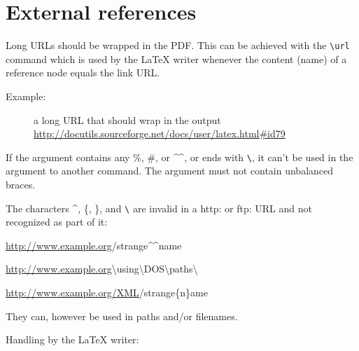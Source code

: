 \documentclass[a4paper]{article}
\newenvironment{DUlineblock}[1]{%
    \list{}{\setlength{\partopsep}{\parskip}
            \addtolength{\partopsep}{\baselineskip}
            \setlength{\topsep}{0pt}
            \setlength{\itemsep}{0.15\baselineskip}
            \setlength{\parsep}{0pt}
            \setlength{\leftmargin}{#1}}
    \raggedright
  }
  {\endlist}
\begin{document}
\section{External references%
  \label{external-references}%
}

Long URLs should be wrapped in the PDF. This can be achieved with the
\texttt{\textbackslash{}url} command which is used by the LaTeX writer whenever the content
(name) of a reference node equals the link URL.

\begin{description}
\item[{Example:}] 
a long URL that should wrap in the output
\url{http://docutils.sourceforge.net/docs/user/latex.html\#id79}

\end{description}

If the argument contains any \textquotedbl{}\%\textquotedbl{}, \textquotedbl{}\#\textquotedbl{}, or \textquotedbl{}\textasciicircum{}\textasciicircum{}\textquotedbl{}, or ends with \texttt{\textbackslash{}}, it can't
be used in the argument to another command. The argument must not contain
unbalanced braces.

The characters \textasciicircum{}, \{, \}, and \texttt{\textbackslash{}} are invalid in a \textquotedbl{}http:\textquotedbl{} or \textquotedbl{}ftp:\textquotedbl{} URL
and not recognized as part of it:

\begin{DUlineblock}{0em}
\item[] \url{http://www.example.org}/strange\textasciicircum{}\textasciicircum{}name
\item[] \url{http://www.example.org}\textbackslash{}using\textbackslash{}DOS\textbackslash{}paths\textbackslash{}
\item[] \url{http://www.example.org/XML}/strange\{n\}ame
\end{DUlineblock}

They can, however be used in paths and/or filenames.

Handling by the LaTeX writer:
\end{document}

